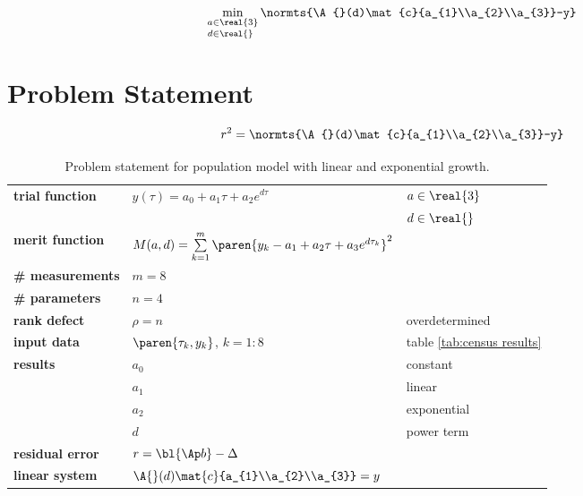   \begin{equation} %
      \min_{\substack{a\in\real{3}\\d\in\real{}\phantom{^{3}}}} \normts{\A{}(d)\mat{c}{a_{1}\\a_{2}\\a_{3}}-y}
  \end{equation}
\section{Problem Statement}  %

  \begin{equation}   %
     r^{2} = \normts{\A{}(d)\mat{c}{a_{1}\\a_{2}\\a_{3}}-y}
    \label{eq:census:error}
  \end{equation}

  \begin{table}[t]  %
    \caption{Problem statement for population model with linear and exponential growth.}
    \begin{center}
      \begin{tabular}{lll}
        \bf{trial function} & $y(\tau) = a_{0} + a_{1} \tau + a_{2} e^{d \tau}$ & $a\in\real{3}$ \\
        && $d\in\real{}$ \\
        \bf{merit function} & $M(a,d) = \sum\limits_{k=1}^{m}\paren{y_{k} - a_{1} + a_{2} \tau + a_{3} e^{d \tau_{k}}}^{2}$ \\
        \bf{\# measurements}& $m = 8$ \\
        \bf{\# parameters}  & $n = 4$ \\
        \bf{rank defect}    & $\rho = n$ & overdetermined \\
        \bf{input data}     & $\paren{\tau_{k}, y_{k}}$, $k=1\colon 8$ & table \ref{tab:census results}\\
        \bf{results}        & $a_{0}$ & constant\\
                            & $a_{1}$ & linear\\
                            & $a_{2}$ & exponential\\
                            & $d$      & power term\\
        \bf{residual error} & $r = \bl{\Ap b} - \Delta$ \\
        \bf{linear system}  & $\A{}(d)\mat{c}{a_{1}\\a_{2}\\a_{3}} = y$ \\
      \end{tabular}
    \end{center}
  \label{tab:census problem statement}
  \end{table}%

